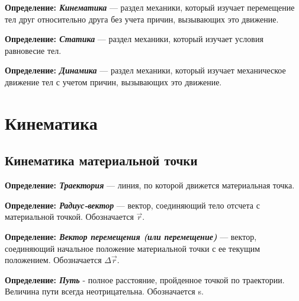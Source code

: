 \documentclass[12pt,a4paper]{report}
\begin{document}
\vspace{5px}

\textbf{Определение: \textit{Кинематика}} --- раздел механики, который изучает перемещение тел друг относительно друга без учета причин, вызывающих это движение.

\vspace{5px}

\textbf{Определение: \textit{Статика}} --- раздел механики, который изучает условия равновесие тел.

\vspace{5px}

\textbf{Определение: \textit{Динамика}} --- раздел механики, который изучает механическое движение тел с учетом причин, вызывающих это движение.

\vspace{3px}

\section{Кинематика}
\subsection{Кинематика материальной точки}
\textbf{Определение: \textit{Траектория}} --- линия, по которой движется материальная точка.

\vspace{5px}

\textbf{Определение: \textit{Радиус-вектор}} --- вектор, соединяющий тело отсчета с материальной точкой. Обозначается $\vec r$.

\vspace{5px}

\textbf{Определение: \textit{Вектор перемещения (или перемещение)}} --- вектор, соединяющий начальное положение материальной точки с ее текущим положением. Обозначается $\Delta \vec r$.

\vspace{5px}

\textbf{Определение: \textit{Путь}} - полное расстояние, пройденное точкой по траектории. Величина пути всегда неотрицательна. Обозначается s.

\vspace{5px}
\end{document}
